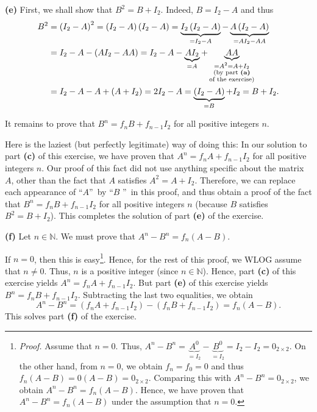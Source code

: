 \documentclass[paper=a4, fontsize=12pt]{scrartcl}%
\theoremstyle{plainsl}
\theoremstyle{definition}
\theoremstyle{remark}
\begin{document}
\bigskip

\textbf{(e)} First, we shall show that $B^{2}=B+I_{2}$. Indeed, $B=I_{2}-A$
and thus%
\begin{align*}
B^{2}  &  =\left(  I_{2}-A\right)  ^{2}=\left(  I_{2}-A\right)  \left(
I_{2}-A\right)  =\underbrace{I_{2}\left(  I_{2}-A\right)  }_{=I_{2}%
-A}-\underbrace{A\left(  I_{2}-A\right)  }_{=AI_{2}-AA}\\
&  =I_{2}-A-\left(  AI_{2}-AA\right)  =I_{2}-A-\underbrace{AI_{2}}%
_{=A}+\underbrace{AA}_{\substack{=A^{2}=A+I_{2}\\\text{(by part \textbf{(a)}%
}\\\text{of the exercise)}}}\\
&  =I_{2}-A-A+\left(  A+I_{2}\right)  =2I_{2}-A=\underbrace{\left(
I_{2}-A\right)  }_{=B}+I_{2}=B+I_{2}.
\end{align*}


It remains to prove that $B^{n}=f_{n}B+f_{n-1}I_{2}$ for all positive integers
$n$.

Here is the laziest (but perfectly legitimate) way of doing this: In our
solution to part \textbf{(c)} of this exercise, we have proven that
$A^{n}=f_{n}A+f_{n-1}I_{2}$ for all positive integers $n$. Our proof of this
fact did not use anything specific about the matrix $A$, other than the fact
that $A$ satisfies $A^{2}=A+I_{2}$. Therefore, we can replace each appearance
of \textquotedblleft$A$\textquotedblright\ by \textquotedblleft$B$%
\textquotedblright\ in this proof, and thus obtain a proof of the fact that
$B^{n}=f_{n}B+f_{n-1}I_{2}$ for all positive integers $n$ (because $B$
satisfies $B^{2}=B+I_{2}$). This completes the solution of part \textbf{(e)}
of the exercise.

\bigskip

\textbf{(f)} Let $n\in\mathbb{N}$. We must prove that $A^{n}-B^{n}%
=f_{n}\left(  A-B\right)  $.

If $n=0$, then this is easy\footnote{\textit{Proof.} Assume that $n=0$. Thus,
$A^{n}-B^{n}=\underbrace{A^{0}}_{=I_{2}}-\underbrace{B^{0}}_{=I_{2}}%
=I_{2}-I_{2}=0_{2\times2}$. On the other hand, from $n=0$, we obtain
$f_{n}=f_{0}=0$ and thus $f_{n}\left(  A-B\right)  =0\left(  A-B\right)
=0_{2\times2}$. Comparing this with $A^{n}-B^{n}=0_{2\times2}$, we obtain
$A^{n}-B^{n}=f_{n}\left(  A-B\right)  $. Hence, we have proven that
$A^{n}-B^{n}=f_{n}\left(  A-B\right)  $ under the assumption that $n=0$.}.
Hence, for the rest of this proof, we WLOG assume that $n\neq0$. Thus, $n$ is
a positive integer (since $n\in\mathbb{N}$). Hence, part \textbf{(c)} of this
exercise yields $A^{n}=f_{n}A+f_{n-1}I_{2}$. But part \textbf{(e)} of this
exercise yields $B^{n}=f_{n}B+f_{n-1}I_{2}$. Subtracting the last two
equalities, we obtain%
\[
A^{n}-B^{n}=\left(  f_{n}A+f_{n-1}I_{2}\right)  -\left(  f_{n}B+f_{n-1}%
I_{2}\right)  =f_{n}\left(  A-B\right)  .
\]
This solves part \textbf{(f)} of the exercise.
\end{document}

